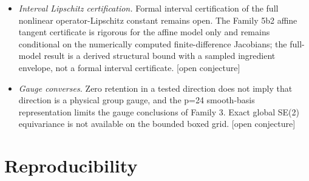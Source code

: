 \documentclass[12pt]{article}
\newcommand{\OPN}{\textnormal{[open conjecture]}}
\begin{document}
\begin{itemize}
finite scenario, that the current-space $G_S$ composition and range
containment hold while the $V_{GS}$/SOM and map-tangent $V_A$/$K_{\mathrm{eff}}$
mode subspaces are distinct. This is numerical evidence, not a continuum
theorem, and no pullback/composition theorem $A=G_ST_\chi$ or SOM quality
claim was proved. \OPN{}
\item \emph{Interval Lipschitz certification.} Formal interval certification of
the full nonlinear operator-Lipschitz constant remains open. The Family 5b2
affine tangent certificate is rigorous for the affine model only and remains
conditional on the numerically computed finite-difference Jacobians; the
full-model result is a derived structural bound with a sampled ingredient
envelope, not a formal interval certificate. \OPN{}
\item \emph{Gauge converses.} Zero retention in a tested direction does not
imply that direction is a physical group gauge, and the p=24 smooth-basis
representation limits the gauge conclusions of Family 3. Exact global SE(2)
equivariance is not available on the bounded boxed grid. \OPN{}
\end{itemize}

\section{Reproducibility}\label{sec:repro}
\end{document}
